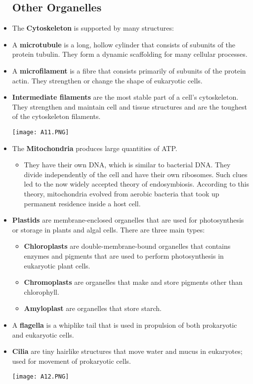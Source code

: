 \documentclass[letterpaper]{article}
\begin{document}
\begin{itemize}
    \subsection{Other Organelles}
    \item The \textbf{Cytoskeleton} is supported by many structures:
    \item A \textbf{microtubule} is a long, hollow cylinder that consists of subunits of the protein tubulin. They form a dynamic scaffolding for many cellular processes.
    \item A \textbf{microfilament} is a fibre that consists primarily of subunits of the protein actin. They strengthen or change the shape of eukaryotic cells.
    \item \textbf{Intermediate filaments} are the most stable part of a cell’s cytoskeleton. They strengthen and maintain cell and tissue structures and are the toughest of the cytoskeleton filaments.
    \begin{center}\texttt{[image: A11.PNG]}\end{center}
    \newpage
    \item The \textbf{Mitochondria} produces large quantities of ATP.
    \begin{itemize}
        \item They have their own DNA, which is similar to bacterial DNA. They divide independently of the cell and have their own ribosomes. Such clues led to the now widely accepted theory of endosymbiosis. According to this theory, mitochondria evolved from aerobic bacteria that took up permanent residence inside a host cell.
    \end{itemize}
    \item \textbf{Plastids} are membrane-enclosed organelles that are used for photosynthesis or storage in plants and algal cells. There are three main types:
    \begin{itemize}
        \item \textbf{Chloroplasts} are double-membrane-bound organelles that contains enzymes and pigments that are used to perform photosynthesis in eukaryotic plant cells.
        \item \textbf{Chromoplasts} are organelles that make and store pigments other than chlorophyll.
        \item \textbf{Amyloplast} are organelles that store starch.
    \end{itemize}
    \item A \textbf{flagella} is a whiplike tail that is used in propulsion of both prokaryotic and eukaryotic cells.
    \item \textbf{Cilia} are tiny hairlike structures that move water and mucus in eukaryotes; used for movement of prokaryotic cells.
    \begin{center}\texttt{[image: A12.PNG]}\end{center}

\end{itemize}
\end{document}
